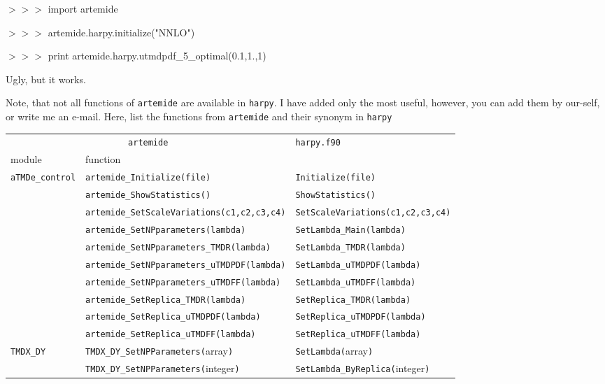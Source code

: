 \documentclass[prd,nofootinbib,eqsecnum,final]{revtex4}
\renewcommand{\(}{\left(}
\renewcommand{\)}{\right)}
\renewcommand{\[}{\left[}
\renewcommand{\]}{\right]}
\begin{document}
$>>>$ import artemide

$>>>$ artemide.harpy.initialize("NNLO")

$>>>$ print artemide.harpy.utmdpdf\_5\_optimal(0.1,1.,1)

Ugly, but it works.

Note, that not all functions of \texttt{artemide} are available in \texttt{harpy}. I have added only the most useful, however, you can add them by our-self, or write me an e-mail. Here, list the functions from \texttt{artemide} and their synonym in \texttt{harpy}

\begin{center}

\small
\begin{longtable}{|l|l||p{6cm}|}
\multicolumn{2}{|c||}{\texttt{artemide}} & \texttt{harpy.f90} 
\\
module & function & \\
\hline\hline
\texttt{aTMDe\_control} & \texttt{artemide\_Initialize(file)} & \texttt{Initialize(file)} 
\\\cline{2-3}
& \texttt{artemide\_ShowStatistics()} & \texttt{ShowStatistics()} 
\\\cline{2-3}
& \texttt{artemide\_SetScaleVariations(c1,c2,c3,c4)} & \texttt{SetScaleVariations(c1,c2,c3,c4)} 
\\\cline{2-3}
& \texttt{artemide\_SetNPparameters(lambda)} & \texttt{SetLambda\_Main(lambda)}
\\\cline{2-3}
& \texttt{artemide\_SetNPparameters\_TMDR(lambda)} & \texttt{SetLambda\_TMDR(lambda)}
\\\cline{2-3}
& \texttt{artemide\_SetNPparameters\_uTMDPDF(lambda)} & \texttt{SetLambda\_uTMDPDF(lambda)} 
\\\cline{2-3}
& \texttt{artemide\_SetNPparameters\_uTMDFF(lambda)} & \texttt{SetLambda\_uTMDFF(lambda)}
\\\cline{2-3}
& \texttt{artemide\_SetReplica\_TMDR(lambda)} & \texttt{SetReplica\_TMDR(lambda)}
\\\cline{2-3}
& \texttt{artemide\_SetReplica\_uTMDPDF(lambda)} & \texttt{SetReplica\_uTMDPDF(lambda)}
\\\cline{2-3}
& \texttt{artemide\_SetReplica\_uTMDFF(lambda)} & \texttt{SetReplica\_uTMDFF(lambda)}
\\\hline
\texttt{TMDX\_DY} & \texttt{TMDX\_DY\_SetNPParameters(}array\texttt{)} & \texttt{SetLambda(}array\texttt{)} 
\\\cline{2-3}
& \texttt{TMDX\_DY\_SetNPParameters(}integer\texttt{)} & \texttt{SetLambda\_ByReplica(}integer\texttt{)} 

\end{longtable}
\end{center}
\end{document}
